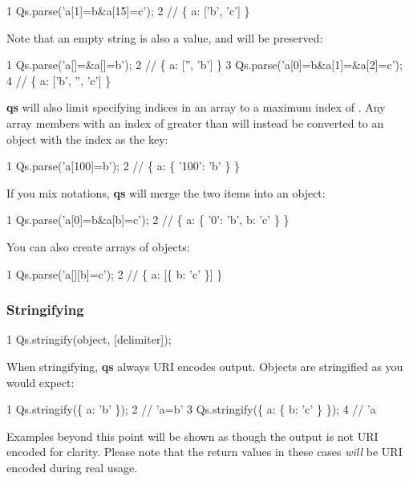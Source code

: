 \begin{DoxyCode}
1 Qs.parse('a[1]=b&a[15]=c');
2 // \{ a: ['b', 'c'] \}
\end{DoxyCode}


Note that an empty string is also a value, and will be preserved\+:


\begin{DoxyCode}
1 Qs.parse('a[]=&a[]=b');
2 // \{ a: ['', 'b'] \}
3 Qs.parse('a[0]=b&a[1]=&a[2]=c');
4 // \{ a: ['b', '', 'c'] \}
\end{DoxyCode}


{\bfseries qs} will also limit specifying indices in an array to a maximum index of {}. Any array members with an index of greater than {} will instead be converted to an object with the index as the key\+:


\begin{DoxyCode}
1 Qs.parse('a[100]=b');
2 // \{ a: \{ '100': 'b' \} \}
\end{DoxyCode}


If you mix notations, {\bfseries qs} will merge the two items into an object\+:


\begin{DoxyCode}
1 Qs.parse('a[0]=b&a[b]=c');
2 // \{ a: \{ '0': 'b', b: 'c' \} \}
\end{DoxyCode}


You can also create arrays of objects\+:


\begin{DoxyCode}
1 Qs.parse('a[][b]=c');
2 // \{ a: [\{ b: 'c' \}] \}
\end{DoxyCode}


\subsubsection*{Stringifying}


\begin{DoxyCode}
1 Qs.stringify(object, [delimiter]);
\end{DoxyCode}


When stringifying, {\bfseries qs} always U\+R\+I encodes output. Objects are stringified as you would expect\+:


\begin{DoxyCode}
1 Qs.stringify(\{ a: 'b' \});
2 // 'a=b'
3 Qs.stringify(\{ a: \{ b: 'c' \} \});
4 // 'a%
\end{DoxyCode}


Examples beyond this point will be shown as though the output is not U\+R\+I encoded for clarity. Please note that the return values in these cases {\itshape will} be U\+R\+I encoded during real usage.

